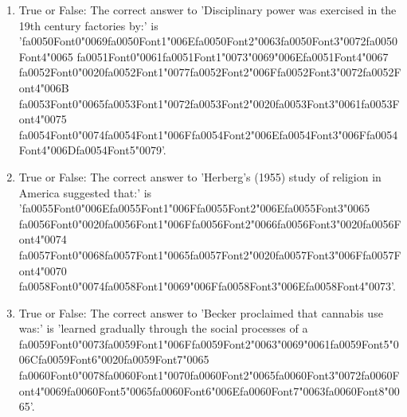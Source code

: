 \documentclass[12pt]{article}
\begin{document}
\begin{enumerate}[label=\arabic*.]
\item True or False: The correct answer to 'Disciplinary power was exercised in the 19th century factories by:' is '{\csname fa0050Font0\endcsname\char"0069}{\csname fa0050Font1\endcsname\char"006E}{\csname fa0050Font2\endcsname\char"0063}{\csname fa0050Font3\endcsname\char"0072}{\csname fa0050Font4\endcsname\char"0065} {\csname fa0051Font0\endcsname\char"0061}{\csname fa0051Font1\endcsname\char"0073}{\char"0069}{\char"006E}{\csname fa0051Font4\endcsname\char"0067} {\csname fa0052Font0\endcsname\char"0020}{\csname fa0052Font1\endcsname\char"0077}{\csname fa0052Font2\endcsname\char"006F}{\csname fa0052Font3\endcsname\char"0072}{\csname fa0052Font4\endcsname\char"006B} {\csname fa0053Font0\endcsname\char"0065}{\csname fa0053Font1\endcsname\char"0072}{\csname fa0053Font2\endcsname\char"0020}{\csname fa0053Font3\endcsname\char"0061}{\csname fa0053Font4\endcsname\char"0075} {\csname fa0054Font0\endcsname\char"0074}{\csname fa0054Font1\endcsname\char"006F}{\csname fa0054Font2\endcsname\char"006E}{\csname fa0054Font3\endcsname\char"006F}{\csname fa0054Font4\endcsname\char"006D}{\csname fa0054Font5\endcsname\char"0079}'.
\item True or False: The correct answer to 'Herberg's (1955) study of religion in America suggested that:' is '{\csname fa0055Font0\endcsname\char"006E}{\csname fa0055Font1\endcsname\char"006F}{\csname fa0055Font2\endcsname\char"006E}{\csname fa0055Font3\endcsname\char"0065} {\csname fa0056Font0\endcsname\char"0020}{\csname fa0056Font1\endcsname\char"006F}{\csname fa0056Font2\endcsname\char"0066}{\csname fa0056Font3\endcsname\char"0020}{\csname fa0056Font4\endcsname\char"0074} {\csname fa0057Font0\endcsname\char"0068}{\csname fa0057Font1\endcsname\char"0065}{\csname fa0057Font2\endcsname\char"0020}{\csname fa0057Font3\endcsname\char"006F}{\csname fa0057Font4\endcsname\char"0070} {\csname fa0058Font0\endcsname\char"0074}{\csname fa0058Font1\endcsname\char"0069}{\char"006F}{\csname fa0058Font3\endcsname\char"006E}{\csname fa0058Font4\endcsname\char"0073}'.
\item True or False: The correct answer to 'Becker proclaimed that cannabis use was:' is 'learned gradually through the social processes of a {\csname fa0059Font0\endcsname\char"0073}{\csname fa0059Font1\endcsname\char"006F}{\csname fa0059Font2\endcsname\char"0063}{\char"0069}{\char"0061}{\csname fa0059Font5\endcsname\char"006C}{\csname fa0059Font6\endcsname\char"0020}{\csname fa0059Font7\endcsname\char"0065} {\csname fa0060Font0\endcsname\char"0078}{\csname fa0060Font1\endcsname\char"0070}{\csname fa0060Font2\endcsname\char"0065}{\csname fa0060Font3\endcsname\char"0072}{\csname fa0060Font4\endcsname\char"0069}{\csname fa0060Font5\endcsname\char"0065}{\csname fa0060Font6\endcsname\char"006E}{\csname fa0060Font7\endcsname\char"0063}{\csname fa0060Font8\endcsname\char"0065}'.

\end{enumerate}
\end{document}
